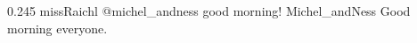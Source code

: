 {0.245}
{\joinNameTweet
{missRaichl}
{@michel\_andness good morning!}}
{\joinNameTweet
{Michel\_andNess}
{Good morning everyone.}}
%
%
%
%
%
%
%
%
%
%
